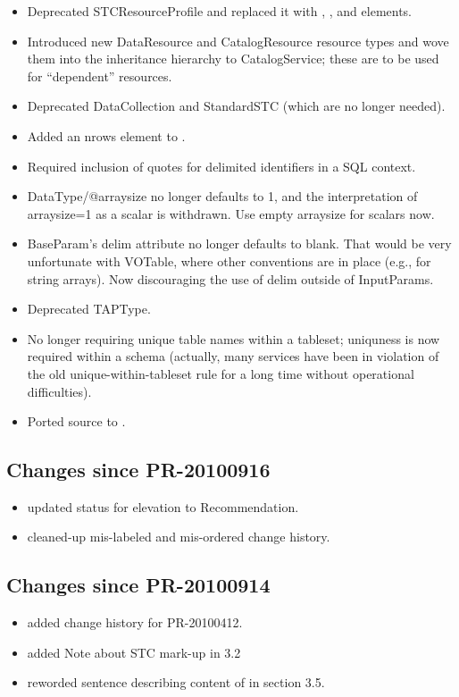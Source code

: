 \documentclass[11pt,a4paper]{ivoa}
\begin{document}
\begin{itemize}
\item Deprecated STCResourceProfile and replaced it with
, , and  elements.
\item Introduced new DataResource and CatalogResource resource types
and wove them into the inheritance hierarchy to CatalogService; these
are to be used for ``dependent'' resources.
\item Deprecated DataCollection and StandardSTC (which are no longer
needed).
\item Added an nrows element to .
\item Required inclusion of quotes for delimited identifiers in a
SQL context.
\item DataType/@arraysize no longer defaults to 1, and the
interpretation of arraysize=1 as a scalar is withdrawn.  Use empty
arraysize for scalars now.
\item BaseParam's delim attribute no longer defaults to blank.  That
would be very unfortunate with VOTable, where other conventions are in
place (e.g., for string arrays).  Now discouraging the use of delim
outside of InputParams.
\item Deprecated TAPType.
\item No longer requiring unique table names within a tableset;
uniquness is now required within a schema (actually, many services have
been in violation of the old unique-within-tableset rule for a long time
without operational difficulties).
\item Ported source to \ivoatex.
\end{itemize}

\subsection{Changes since PR-20100916}

\begin{itemize}
  \item updated status for elevation to Recommendation.
  \item cleaned-up mis-labeled and mis-ordered change history.
\end{itemize}

\subsection{Changes since PR-20100914}

\begin{itemize}
  \item added change history for PR-20100412.
  \item added Note about STC mark-up in 3.2
  \item reworded sentence describing content of  in
       section 3.5.
\end{itemize}
\end{document}

